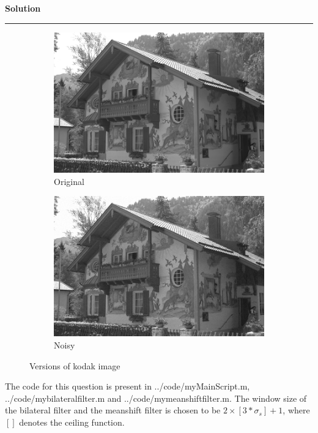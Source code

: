 \documentclass[a4paper,12pt]{article}
\newenvironment{solution}[2][]{%
    \begin{mdframed}[linecolor=green!60!black, linewidth=2pt, roundcorner=10pt, backgroundcolor=green!5!white, skipabove=12pt, skipbelow=12pt]%
        \textbf{\large #2} %
        \par\noindent\rule{\textwidth}{0.4pt} %
        \vspace{0.5em} %
}{%
    \end{mdframed}%
}
\begin{document}
\begin{solution}{Solution}
\begin{figure}[H]
    \centering
    \begin{subfigure}[b]{0.3\textwidth}
        \centering
        \includegraphics[width=\textwidth]{../images/kodak24.png}
        \caption{Original}
        \label{fig:subfig1}
    \end{subfigure}
    \begin{subfigure}[b]{0.3\textwidth}
        \centering
        \includegraphics[width=\textwidth]{../images/noisy_kodak24.png}
        \caption{Noisy }
        \label{fig:subfig2}
    \end{subfigure}
    \caption{Versions of kodak image}
    \label{fig:kodak}
\end{figure}

The code for this question is present in {../code/myMainScript.m}, \\ {../code/mybilateralfilter.m} and {../code/mymeanshiftfilter.m}. The window size of the bilateral filter and the meanshift filter is chosen to be $2\times [3*\sigma_s] + 1$, where $[]$ denotes the ceiling function.



\end{solution}
\end{document}
